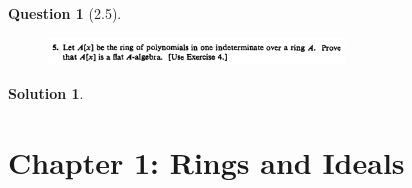 \documentclass[11pt]{article}
\theoremstyle{plain}
\theoremstyle{quest}
\newtheorem*{question}{Question}
\newtheorem*{solution}{Solution}
\begin{document}
\bigskip

\begin{question}[2.5]
\hfill
\begin{figure}[h!]
  \centering
    \includegraphics[width=0.7\textwidth]{d-2-5.png}
\end{figure}
\end{question}
\begin{solution} \hfill \\

\end{solution}

\newpage

\section{Chapter 1: Rings and Ideals} \label{sec:RaI}
\end{document}

